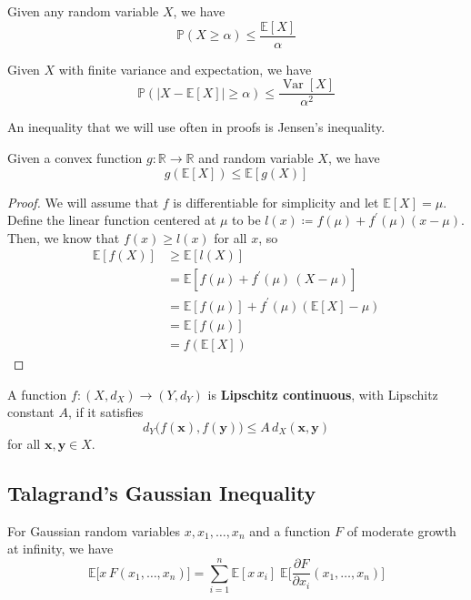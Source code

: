 \documentclass{article}
\DeclareMathOperator{\Var}{Var}
\begin{document}
  \begin{lemma}
  Given any random variable $X$, we have 
  \[\mathbb{P}(X \geq \alpha) \leq \frac{\mathbb{E}[X]}{\alpha}\]
  \end{lemma}

  \begin{lemma}
  Given $X$ with finite variance and expectation, we have 
  \[\mathbb{P}(|X - \mathbb{E}[X]| \geq \alpha) \leq \frac{\Var[X]}{\alpha^2}\]
  \end{lemma}

  An inequality that we will use often in proofs is Jensen's inequality. 

  \begin{lemma}
  Given a convex function $g: \mathbb{R} \rightarrow \mathbb{R}$ and random variable $X$, we have 
  \[g(\mathbb{E}[X]) \leq \mathbb{E}[g(X)]\]
  \end{lemma}
  \begin{proof}
  We will assume that $f$ is differentiable for simplicity and let $\mathbb{E}[X] = \mu$. Define the linear function centered at $\mu$ to be $l(x) \coloneqq f(\mu) + f^\prime (\mu) (x - \mu)$. Then, we know that $f(x) \geq l(x)$ for all $x$, so 
  \begin{align*}
      \mathbb{E}[f(X)] & \geq \mathbb{E}[ l(X)] \\ 
      & = \mathbb{E}[f(\mu) + f^\prime (\mu) \, (X - \mu)] \\
      & = \mathbb{E}[f(\mu)] + f^\prime (\mu) ( \mathbb{E}[X] - \mu) \\
      & = \mathbb{E}[f(\mu)] \\
      & = f(\mathbb{E}[X])
  \end{align*}
  \end{proof}

  \begin{definition}
  A function $f: (X, d_X) \longrightarrow (Y, d_Y)$ is \textbf{Lipschitz continuous}, with Lipschitz constant $A$, if it satisfies 
  \[d_Y \big( f(\mathbf{x}), f(\mathbf{y})\big) \leq A \, d_X (\mathbf{x}, \mathbf{y})\]
  for all $\mathbf{x}, \mathbf{y} \in X$. 
  \end{definition}

  \subsection{Talagrand's Gaussian Inequality}

  \begin{lemma}
  For Gaussian random variables $x, x_1, \ldots, x_n$ and a function $F$ of moderate growth at infinity, we have 
  \[\mathbb{E}\big[ x \, F(x_1, \ldots, x_n) \big] = \sum_{i=1}^n \mathbb{E}[x \, x_i] \; \mathbb{E}\bigg[ \frac{\partial F}{\partial x_i} (x_1, \ldots, x_n) \bigg]\]
  \end{lemma}
\end{document}
